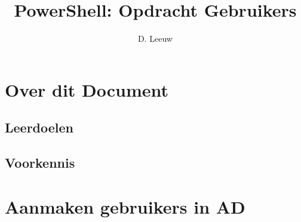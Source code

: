 \documentclass[a4paper,12pt,twoside,openright,titlepage]{article}
\author{D. Leeuw}
\title{PowerShell: Opdracht Gebruikers}
\date{\today\\
0.5.0 \\
\vfill
\raggedright
\copyright\ 2026 Dennis Leeuw\\
}
\begin{document}

\maketitle


\section{Over dit Document}
\subsection{Leerdoelen}
\subsection{Voorkennis}



\section{Aanmaken gebruikers in AD}


\printindex
\end{document}
